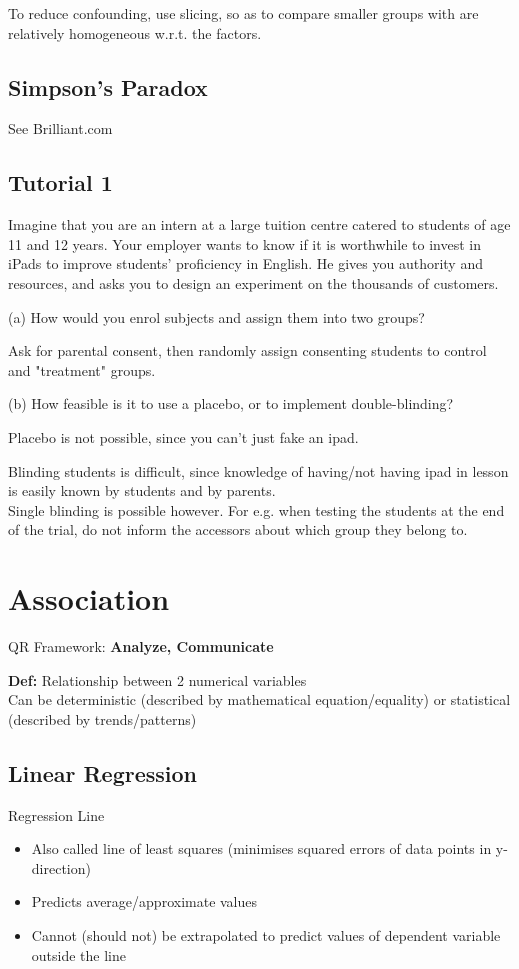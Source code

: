 \documentclass{article}
\begin{document}
To reduce confounding, use slicing, so as to compare smaller groups with are relatively homogeneous w.r.t. the factors.

\subsection{Simpson's Paradox}
See Brilliant.com

\subsection{Tutorial 1}
Imagine	that you are an intern	at	a	large	tuition	centre catered	to	students	of	age	11	and	12	years. Your	 employer wants to know	 if	 it	 is	 worthwhile	 to	 invest in iPads to improve students’ proficiency in English. He gives you authority and	resources,	and asks you to design an experiment	on	the	thousands	of	customers.

(a)	How	would	you	enrol	subjects	and	assign	them	into	two	groups?

Ask for parental consent, then randomly assign consenting students to control and "treatment" groups.


(b)	How	feasible is	it	to	use	a placebo, or to implement double-blinding?

Placebo is not possible, since you can't just fake an ipad.

Blinding students is difficult, since knowledge of having/not having ipad in lesson is easily known by students and by parents.\\
Single blinding is possible however. For e.g. when testing the students at the end of the trial, do not inform the accessors about which group they belong to.

\section{Association}
QR Framework: \textbf{Analyze, Communicate}

\textbf{Def:} Relationship between 2 numerical variables\\
Can be deterministic (described by mathematical equation/equality) or statistical (described by trends/patterns)

\subsection{Linear Regression}
Regression Line
\begin{itemize}
	\item Also called line of least squares (minimises squared errors of data points in y-direction)
	\item Predicts average/approximate values
	\item Cannot (should not) be extrapolated to predict values of dependent variable outside the line
\end{itemize}
\end{document}
